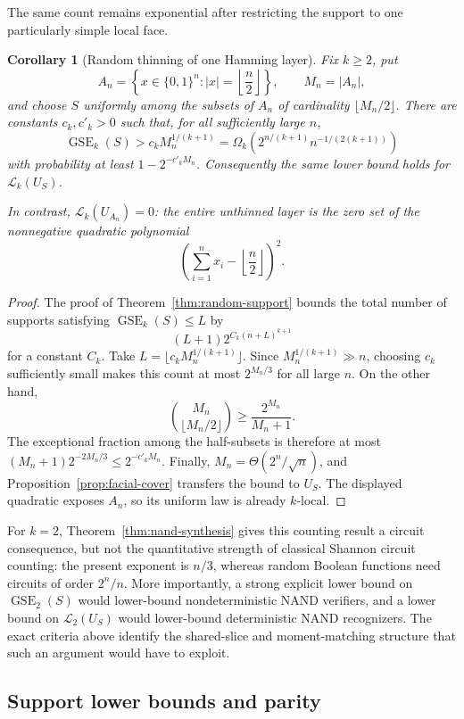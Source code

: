 \documentclass{article}
\newcommand{\LC}{\mathcal{L}}
\newcommand{\GSE}{\operatorname{GSE}}
\newcommand{\bits}{\{0,1\}}
\newtheorem{corollary}{Corollary}
\begin{document}
The same count remains exponential after restricting the support to one
particularly simple local face.

\begin{corollary}[Random thinning of one Hamming layer]
\label{cor:random-middle-layer}
Fix $k\ge2$, put
\[
  A_n=\left\{x\in\bits^n:|x|=\left\lfloor\frac n2\right\rfloor\right\},
  \qquad M_n=|A_n|,
\]
and choose $S$ uniformly among the subsets of $A_n$ of cardinality
$\lfloor M_n/2\rfloor$.  There are constants $c_k,c'_k>0$ such that, for all
sufficiently large $n$,
\[
  \GSE_k(S)>c_kM_n^{1/(k+1)}
  =\Omega_k\!\left(
    2^{n/(k+1)}n^{-1/(2(k+1))}
  \right)
\]
with probability at least $1-2^{-c'_kM_n}$.  Consequently the same lower bound
holds for $\LC_k(U_S)$.

In contrast, $\LC_k(U_{A_n})=0$: the entire unthinned layer is the zero set of
the nonnegative quadratic polynomial
\[
  \left(\sum_{i=1}^n x_i-\left\lfloor\frac n2\right\rfloor\right)^2.
\]
\end{corollary}

\begin{proof}
The proof of Theorem~\ref{thm:random-support} bounds the total number of
supports satisfying $\GSE_k(S)\le L$ by
\[
  (L+1)2^{C_k(n+L)^{k+1}}
\]
for a constant $C_k$.  Take
$L=\lfloor c_kM_n^{1/(k+1)}\rfloor$.  Since
$M_n^{1/(k+1)}\gg n$, choosing $c_k$ sufficiently small makes this count at
most $2^{M_n/3}$ for all large $n$.  On the other hand,
\[
  \binom{M_n}{\lfloor M_n/2\rfloor}
  \ge\frac{2^{M_n}}{M_n+1}.
\]
The exceptional fraction among the half-subsets is therefore at most
$(M_n+1)2^{-2M_n/3}\le2^{-c'_kM_n}$.  Finally,
$M_n=\Theta(2^n/\sqrt n)$, and
Proposition~\ref{prop:facial-cover} transfers the bound to $U_S$.  The displayed
quadratic exposes $A_n$, so its uniform law is already $k$-local.
\end{proof}

For $k=2$, Theorem~\ref{thm:nand-synthesis} gives this counting result a circuit
consequence, but not the quantitative strength of classical Shannon circuit
counting: the present exponent is $n/3$, whereas random Boolean functions need
circuits of order $2^n/n$.  More importantly, a strong explicit lower bound on
$\GSE_2(S)$ would lower-bound nondeterministic NAND verifiers, and a lower bound
on $\LC_2(U_S)$ would lower-bound deterministic NAND recognizers.  The exact
criteria above identify the shared-slice and moment-matching structure that
such an argument would have to exploit.

\subsection{Support lower bounds and parity}
\end{document}

